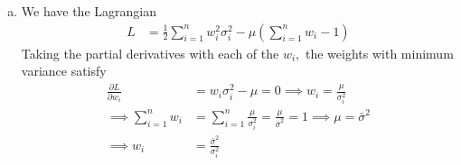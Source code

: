 \documentclass{article}
\begin{document}
\begin{enumerate}
\begin{enumerate}[(a)]
			\item 
				\begin{soln}
					We have the Lagrangian
					\begin{align*}
						L &= \frac{1}{2} \sum_{i=1}^{n} w_i^2\sigma_i^2 - \mu\left( \sum_{i=1}^{n} w_i - 1 \right)
					\end{align*}
					Taking the partial derivatives with each of the $w_i,$ the weights with minimum variance satisfy
					\begin{align*}
						\frac{\partial L}{\partial w_i} &= w_i\sigma_i^2 - \mu = 0 \implies w_i = \frac{\mu}{\sigma_i^2} \\
						\implies \sum_{i=1}^{n} w_i &= \sum_{i=1}^{n} \frac{\mu}{\sigma_i^2} = \frac{\mu}{\bar\sigma^2} = 1 \implies \mu = \bar\sigma^2 \\
						\implies w_i &= \frac{\bar\sigma^2}{\sigma_i^2}
					\end{align*}
				\end{soln}

		\end{enumerate}


\end{enumerate}
\end{document}
